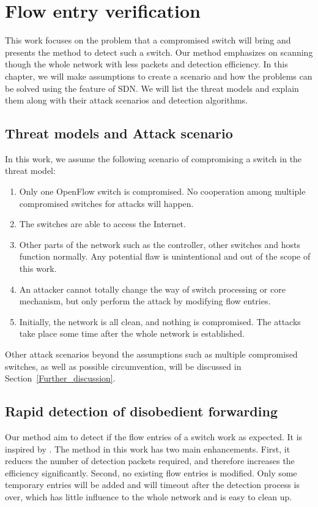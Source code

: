 \chapter{Flow entry verification}
This work focuses on the problem that a compromised switch will bring and presents the method to detect such a switch. Our method emphasizes on scanning though the whole network with less packets and detection efficiency. In this chapter, we will make assumptions to create a scenario and how the problems can be solved using the feature of SDN. We will list the threat models and explain them along with their attack scenarios and detection algorithms.

\section{Threat models and Attack scenario}
In this work, we assume the following scenario of compromising a switch in the threat model:
\begin{enumerate}
\item
Only one OpenFlow switch is compromised. No cooperation among multiple compromised switches for attacks will happen.
\item
The switches are able to access the Internet. 
\item
Other parts of the network such as the controller, other switches and hosts function normally. Any potential flaw is unintentional and out of the scope of this work.
\item
An attacker cannot totally change the way of switch processing or core mechanism, but only perform the attack by modifying flow entries.
\item
Initially, the network is all clean, and nothing is compromised. The attacks take place some time after the whole network is established.
\end{enumerate}

Other attack scenarios beyond the assumptions such as multiple compromised switches, as well as possible circumvention, will be discussed in Section~\ref{Further_discussion}.

\section{Rapid detection of disobedient forwarding}
Our method aim to detect if the flow entries of a switch work as expected. It is inspired by \cite{CKGL15}. The method in this work has two main enhancements. First, it reduces the number of detection packets required, and therefore increases the efficiency significantly. Second, no existing flow entries is modified. Only some temporary entries will be added and will timeout after the detection process is over, which has little influence to the whole network and is easy to clean up. 

